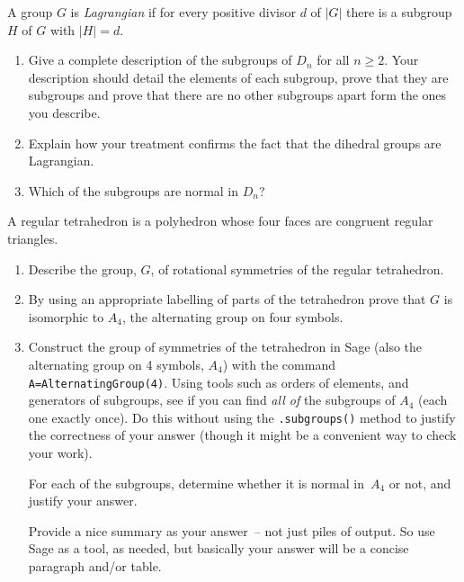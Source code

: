 \documentclass[oneside,10pt]{amsart}
\begin{document}
\noindent
A group $G$ is \emph{Lagrangian} if for every positive divisor $d$ of $|G|$ there is a subgroup $H$ of $G$ with $|H| = d$.
\begin{enumerate}[label=(\alph*)]
\item
Give a complete description of the subgroups of $D_n$ for all $n \geq 2$. Your description should detail the elements of each subgroup, prove that they are subgroups and prove that there are no other subgroups apart form the ones you describe.
\item
Explain how your treatment confirms the fact that the dihedral groups are Lagrangian.
\item
Which of the subgroups are normal in $D_n$?
\end{enumerate}
A regular tetrahedron is a polyhedron whose four faces are congruent regular triangles.
\begin{enumerate}[label=(\alph*)]
\item
Describe the group, $G$, of rotational symmetries of the regular tetrahedron.
\item
By using an appropriate labelling of parts of the tetrahedron prove that $G$ is isomorphic to $A_4$, the alternating group on four symbols.
\item
Construct the group of symmetries of the tetrahedron in Sage (also the alternating group on 4 symbols, \(A_4\)) with the command \texttt{A=AlternatingGroup(4)}.  Using tools such as orders of elements, and generators of subgroups, see if you can find \emph{all of} the subgroups of \(A_4\) (each one exactly once).  Do this without using the \texttt{.subgroups()} method to justify the correctness of your answer (though it might be a convenient way to check your work).%

For each of the subgroups, determine whether it is normal in~$A_4$ or not, and justify your answer.

Provide a nice summary as your answer~-- not just piles of output.  So use Sage as a tool, as needed, but basically your answer will be a concise paragraph and/or table.
\end{enumerate}
\end{document}
